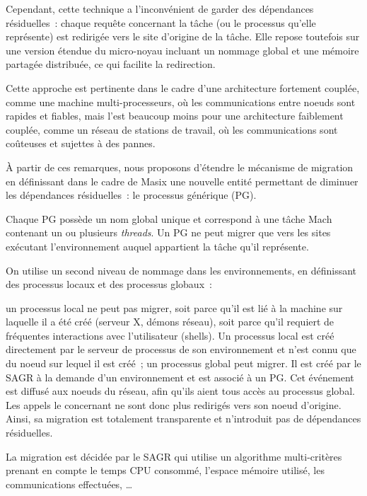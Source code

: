 \documentclass[11pt,a4paper]{article}
\begin{document}
Cependant, cette technique a l'inconvénient de garder des dépendances 
résiduelles~: chaque requ\^ete concernant la t\^ache (ou 
le processus qu'elle représente) est redirigée vers le site d'origine de 
la t\^ache. Elle repose toutefois sur une version étendue du micro-noyau incluant un nommage global et une mémoire partagée distribuée, ce qui facilite la redirection.

Cette approche est pertinente dans le cadre d'une architecture fortement couplée, comme une machine multi-processeurs, où les communications entre noeuds sont rapides et fiables, mais l'est beaucoup moins pour une architecture faiblement couplée, comme un réseau de stations de travail, où les communications sont coûteuses et sujettes à des pannes.

\`A partir de ces remarques, nous proposons d'étendre le mécanisme de migration en définissant dans le cadre de Masix une nouvelle entité permettant de diminuer les dépendances résiduelles~: le processus générique (PG).

Chaque PG possède un nom global unique et correspond à une t\^ache Mach
contenant un ou plusieurs {\em threads}. Un PG ne peut migrer que vers les sites exécutant l'environnement auquel appartient la t\^ache qu'il représente.

On utilise un second niveau de nommage dans les environnements, en 
définissant des processus locaux et des processus globaux~:
\begin{itemize}
\myitem un  processus local ne peut pas migrer, soit parce qu'il est lié à la machine sur laquelle il a été créé (serveur X, démons réseau), soit parce qu'il requiert de fréquentes interactions avec l'utilisateur (shells). Un processus local est créé directement par le serveur de processus de son environnement et n'est connu que du noeud sur lequel il est créé~;
\myitem un processus global peut migrer. Il est créé par le SAGR à la demande d'un 
environnement et est associé à un PG. Cet événement est diffusé aux noeuds du réseau, afin qu'ils aient tous accès au processus global. Les appels le concernant ne sont donc plus redirigés vers son noeud d'origine. Ainsi, sa migration est totalement transparente et n'introduit pas de dépendances résiduelles.  
\end{itemize}

La migration est décidée par le SAGR qui utilise un algorithme multi-critères prenant en compte le temps CPU consommé, l'espace mémoire utilisé, les communications effectuées, \dots
\end{document}
